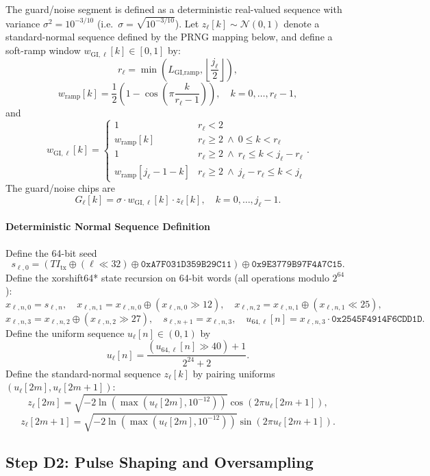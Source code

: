 \documentclass[11pt]{article}
\begin{document}
The guard/noise segment is defined as a deterministic real-valued sequence with variance $\sigma^2=10^{-3/10}$ (i.e.\ $\sigma=\sqrt{10^{-3/10}}$). Let $z_{\ell}[k]\sim\mathcal{N}(0,1)$ denote a standard-normal sequence defined by the PRNG mapping below, and define a soft-ramp window $w_{\text{GI},\ell}[k]\in[0,1]$ by:
\[
  r_\ell=\min\!\left(L_{\text{GI,ramp}},\left\lfloor \frac{j_\ell}{2}\right\rfloor\right),
\]
\[
  w_{\text{ramp}}[k]=\frac{1}{2}\left(1-\cos\left(\pi\frac{k}{r_\ell-1}\right)\right),\quad k=0,\dots,r_\ell-1,
\]
and
\[
  w_{\text{GI},\ell}[k]=
  \begin{cases}
  1 & r_\ell<2\\
  w_{\text{ramp}}[k] & r_\ell\ge 2\ \wedge\ 0\le k<r_\ell\\
  1 & r_\ell\ge 2\ \wedge\ r_\ell\le k<j_\ell-r_\ell\\
  w_{\text{ramp}}[j_\ell-1-k] & r_\ell\ge 2\ \wedge\ j_\ell-r_\ell\le k<j_\ell
  \end{cases}.
\]
The guard/noise chips are
\[
  G_\ell[k]=\sigma\cdot w_{\text{GI},\ell}[k]\cdot z_\ell[k],\quad k=0,\dots,j_\ell-1.
\]

\paragraph{Deterministic Normal Sequence Definition}
Define the 64-bit seed
\[
  s_{\ell,0}=\left(\mathit{TI}_{\text{tx}} \oplus (\ell\ll 32) \oplus \texttt{0xA7F031D359B29C11}\right)\oplus \texttt{0x9E3779B97F4A7C15}.
\]
Define the xorshift64* state recursion on 64-bit words (all operations modulo $2^{64}$):
\[
  x_{\ell,n,0}=s_{\ell,n},\quad x_{\ell,n,1}=x_{\ell,n,0}\oplus (x_{\ell,n,0}\gg 12),\quad x_{\ell,n,2}=x_{\ell,n,1}\oplus (x_{\ell,n,1}\ll 25),
\]
\[
  x_{\ell,n,3}=x_{\ell,n,2}\oplus (x_{\ell,n,2}\gg 27),\quad s_{\ell,n+1}=x_{\ell,n,3},\quad u_{64,\ell}[n]=x_{\ell,n,3}\cdot \texttt{0x2545F4914F6CDD1D}.
\]
Define the uniform sequence $u_\ell[n]\in(0,1)$ by
\[
  u_\ell[n]=\frac{(u_{64,\ell}[n]\gg 40)+1}{2^{24}+2}.
\]
Define the standard-normal sequence $z_\ell[k]$ by pairing uniforms $(u_\ell[2m],u_\ell[2m+1])$:
\[
  z_\ell[2m]=\sqrt{-2\ln(\max(u_\ell[2m],10^{-12}))}\cos(2\pi u_\ell[2m+1]),
\]
\[
  z_\ell[2m+1]=\sqrt{-2\ln(\max(u_\ell[2m],10^{-12}))}\sin(2\pi u_\ell[2m+1]).
\]

\subsection{Step D2: Pulse Shaping and Oversampling}
\end{document}
